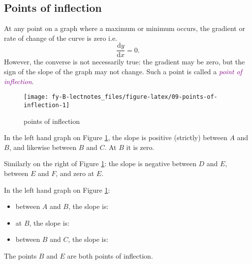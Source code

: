 \documentclass[
  english,
  11pt,
  oneside]{book}
\providecommand{\tightlist}{%
  \setlength{\itemsep}{0pt}\setlength{\parskip}{0pt}}
\newcommand{\slide}{}
\theoremstyle{definition}
\theoremstyle{definition}
\theoremstyle{definition}
\theoremstyle{definition}
\theoremstyle{remark}
\begin{document}
\subsection{Points of inflection}\label{points-of-inflection}

At any point on a graph where a maximum or minimum occurs, the gradient or rate of change of the curve is zero i.e.
\[
\frac{\mathrm{d} y}{\mathrm{d} x}=0.
\]
However, the converse is not necessarily true: the gradient may be zero, but the sign of the slope of the graph may not change. Such a point is called a \textcolor{purple}{\em point of inflection}.

\slide

\begin{figure}

{\centering \texttt{[image: fy-B-lectnotes\_files/figure-latex/09-points-of-inflection-1]} 

}

\caption{points of inflection}\label{fig:09-points-of-inflection}
\end{figure}

\begin{notslides}

In the left hand graph on Figure \ref{fig:09-points-of-inflection}, the slope is positive (strictly) between \(A\) and \(B\), and likewise between \(B\) and \(C\). At \(B\) it is zero.

Similarly on the right of Figure \ref{fig:09-points-of-inflection}:
the slope is negative between \(D\) and \(E\), between \(E\) and \(F\), and zero at \(E\).

\end{notslides}

\begin{slidesonly}

In the left hand graph on Figure \ref{fig:09-points-of-inflection}:

\begin{itemize}
\tightlist
\item
  between \(A\) and \(B\), the slope is:
\item
  at \(B\), the slope is:
\item
  between \(B\) and \(C\), the slope is:
\end{itemize}

\end{slidesonly}

The points \(B\) and \(E\) are both points of inflection.
\end{document}
